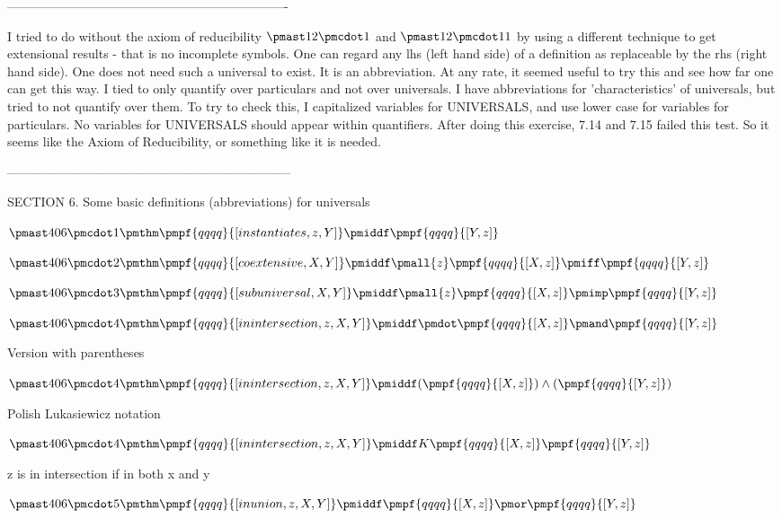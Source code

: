 \documentclass[12pt]{article}
\begin{document}
-------------------------------------------------------------------

I tried to do without the axiom of reducibility $\pmast 12 \pmcdot 1$ and $\pmast 12 \pmcdot 11$ by using a different technique to get extensional results - that is no incomplete symbols. One can regard any lhs (left hand side) of a  definition as replaceable by the rhs (right hand side). One does not need such a universal to exist. It is an abbreviation. At any rate, it seemed useful to try this and see how far one can get this way. I tied to only quantify over particulars and not over universals. I have abbreviations for 'characteristics' of universals, but tried to not quantify over them. To try to check this, I capitalized variables for UNIVERSALS, and use lower case for variables for particulars. No variables for UNIVERSALS should appear within quantifiers. After doing this exercise, 7.14 and 7.15 failed this test. So it seems like the Axiom of Reducibility, or something like it is needed.

--------------------------------------------------------------------

SECTION 6. Some basic definitions (abbreviations) for universals

$\pmast 406 \pmcdot 1 \pmthm \pmpf{qqqq}{[instantiates, z, Y]} \pmiddf \pmpf {qqqq}{[Y, z]} $

$\pmast 406 \pmcdot 2 \pmthm \pmpf{qqqq}{[coextensive, X, Y]} \pmiddf \pmall{z} \pmpf{qqqq}{[X,z]} \pmiff \pmpf{qqqq}{[Y,z]} $

$\pmast 406 \pmcdot 3 \pmthm \pmpf{qqqq}{[subuniversal, X, Y]} \pmiddf \pmall{z} \pmpf{qqqq}{[X, z]}  \pmimp \pmpf{qqqq}{[Y, z]} $

$\pmast 406 \pmcdot 4 \pmthm \pmpf{qqqq}{[inintersection,z, X, Y]} \pmiddf \pmdot \pmpf{qqqq}{[X,z]} \pmand \pmpf{qqqq}{[Y,z]} $
 
 

Version with parentheses

$\pmast 406 \pmcdot 4 \pmthm \pmpf{qqqq}{[inintersection,z, X, Y]} \pmiddf  (  \pmpf{qqqq}{[X,z]} ) \land ( \pmpf{qqqq}{[Y,z]} )$


Polish Lukasiewicz notation

$\pmast 406 \pmcdot 4 \pmthm \pmpf{qqqq}{[inintersection,z,   X,   Y]}   \pmiddf     K   \pmpf{qqqq}{[X,z]}   \pmpf{qqqq}{[Y,z]}  $


z is in intersection if in both x and y

$\pmast 406 \pmcdot 5 \pmthm \pmpf{qqqq}{[inunion,z, X, Y]} \pmiddf \pmpf{qqqq}{[X,z]} \pmor \pmpf{qqqq}{[Y,z]} $
\end{document}
